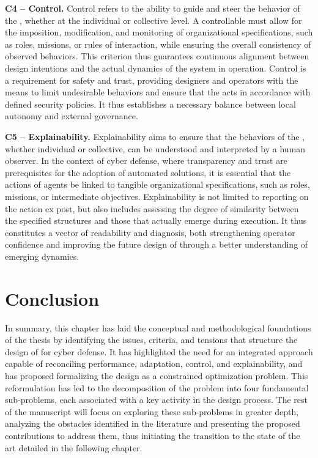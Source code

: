 \medskip

\noindent
\textbf{C4 -- Control.} \quad
Control refers to the ability to guide and steer the behavior of the , whether at the individual or collective level. A controllable  must allow for the imposition, modification, and monitoring of organizational specifications, such as roles, missions, or rules of interaction, while ensuring the overall consistency of observed behaviors. This criterion thus guarantees continuous alignment between design intentions and the actual dynamics of the system in operation. Control is a requirement for safety and trust, providing designers and operators with the means to limit undesirable behaviors and ensure that the  acts in accordance with defined security policies. It thus establishes a necessary balance between local autonomy and external governance.

\medskip

\noindent
\textbf{C5 -- Explainability.} \quad
Explainability aims to ensure that the behaviors of the , whether individual or collective, can be understood and interpreted by a human observer. In the context of cyber defense, where transparency and trust are prerequisites for the adoption of automated solutions, it is essential that the actions of agents be linked to tangible organizational specifications, such as roles, missions, or intermediate objectives. Explainability is not limited to reporting on the action ex post, but also includes assessing the degree of similarity between the specified structures and those that actually emerge during execution. It thus constitutes a vector of readability and diagnosis, both strengthening operator confidence and improving the future design of  through a better understanding of emerging dynamics.

\section{Conclusion}
In summary, this chapter has laid the conceptual and methodological foundations of the thesis by identifying the issues, criteria, and tensions that structure the design of  for cyber defense. It has highlighted the need for an integrated approach capable of reconciling performance, adaptation, control, and explainability, and has proposed formalizing the design as a constrained optimization problem. This reformulation has led to the decomposition of the problem into four fundamental sub-problems, each associated with a key activity in the design process. The rest of the manuscript will focus on exploring these sub-problems in greater depth, analyzing the obstacles identified in the literature and presenting the proposed contributions to address them, thus initiating the transition to the state of the art detailed in the following chapter.

